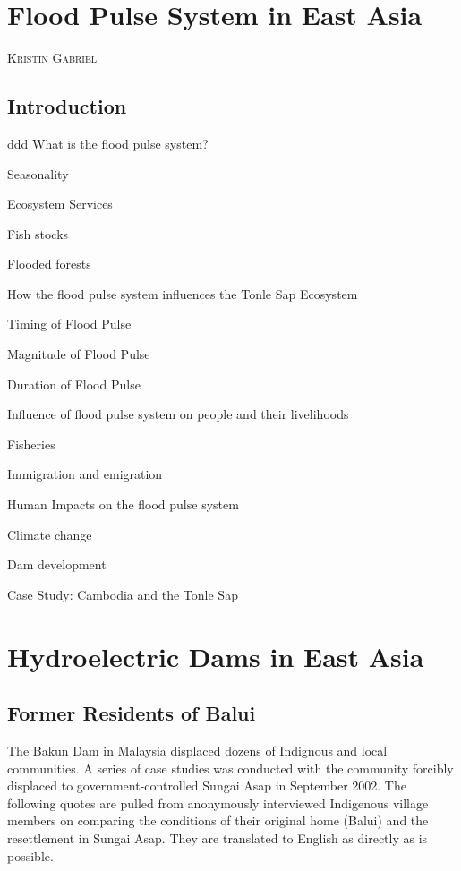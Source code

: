 \documentclass{book}\usepackage{knitr}
\makeatletter
\newcommand{\chapterauthor}[1]{%
  {\parindent0pt\vspace*{-25pt}%
  \linespread{1.1}\large\scshape#1%
  \par\nobreak\vspace*{35pt}}
  \@afterheading%
}
\makeatother
\begin{document}
\begin{knitrout}
\begin{kframe}
{\chapter{Flood Pulse System in East Asia}\label{ch:floodpulse}

\chapterauthor{Kristin Gabriel}

\section{Introduction}
ddd
What is the flood pulse system?

Seasonality

Ecosystem Services

Fish stocks

Flooded forests

How the flood pulse system influences the Tonle Sap Ecosystem

Timing of Flood Pulse

Magnitude of Flood Pulse

Duration of Flood Pulse

Influence of flood pulse system on people and their livelihoods

Fisheries

Immigration and emigration

Human Impacts on the flood pulse system

Climate change

Dam development

Case Study: Cambodia and the Tonle Sap


\chapter{Hydroelectric Dams in East Asia}

\section{Former Residents of Balui}
The Bakun Dam in Malaysia displaced dozens of Indignous and local communities. A series of case studies was conducted with the community forcibly displaced to government-controlled Sungai Asap in September 2002. The following quotes are pulled from anonymously interviewed Indigenous village members on comparing the conditions of their original home (Balui) and the resettlement in Sungai Asap. They are translated to English as directly as is possible. 


}
\end{kframe}
\end{knitrout}
\end{document}
